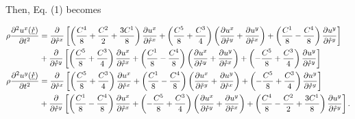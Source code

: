 \documentclass[twoside,twocolumn,9pt]{article}
\begin{document}
Then, Eq. (1) becomes
\begin{strip}
\begin{align}
\rho\frac{\partial^2 u^x(\underline{\mathring{r}})}{\partial t^2}&=\frac{\partial}{\partial\mathring{r}^x}\left[\left(\frac{C^4}{8}+\frac{C^2}{2}+\frac{3C^1}{8}\right)\frac{\partial u^x}{\partial\mathring{r}^x}+\left(\frac{C^5}{8}+\frac{C^3}{4}\right)\left(\frac{\partial u^x}{\partial\mathring{r}^y}+\frac{\partial u^y}{\partial\mathring{r}^x}\right)+\left(\frac{C^1}{8}-\frac{C^4}{8}\right)\frac{\partial u^y}{\partial\mathring{r}^y}\right]\notag\\
&+\frac{\partial}{\partial\mathring{r}^y}\left[\left(\frac{C^5}{8}+\frac{C^3}{4}\right)\frac{\partial u^x}{\partial\mathring{r}^x}+\left(\frac{C^1}{8}-\frac{C^4}{8}\right)\left(\frac{\partial u^x}{\partial\mathring{r}^y}+\frac{\partial u^y}{\partial\mathring{r}^x}\right)+\left(-\frac{C^5}{8}+\frac{C^3}{4}\right)\frac{\partial u^y}{\partial\mathring{r}^y}\right]\notag\\
\rho\frac{\partial^2 u^y(\underline{\mathring{r}})}{\partial t^2}&=\frac{\partial}{\partial\mathring{r}^x}\left[\left(\frac{C^5}{8}+\frac{C^3}{4}\right)\frac{\partial u^x}{\partial\mathring{r}^x}+\left(\frac{C^1}{8}-\frac{C^4}{8}\right)\left(\frac{\partial u^x}{\partial\mathring{r}^y}+\frac{\partial u^y}{\partial\mathring{r}^x}\right)+\left(-\frac{C^5}{8}+\frac{C^3}{4}\right)\frac{\partial u^y}{\partial\mathring{r}^y}\right]\notag\\
&+\frac{\partial}{\partial\mathring{r}^y}\left[\left(\frac{C^1}{8}-\frac{C^4}{8}\right)\frac{\partial u^x}{\partial\mathring{r}^x}+\left(-\frac{C^5}{8}+\frac{C^3}{4}\right)\left(\frac{\partial u^x}{\partial\mathring{r}^y}+\frac{\partial u^y}{\partial\mathring{r}^x}\right)+\left(\frac{C^4}{8}-\frac{C^2}{2}+\frac{3C^1}{8}\right)\frac{\partial u^y}{\partial\mathring{r}^y}\right].
\end{align}
\end{strip}
\end{document}
